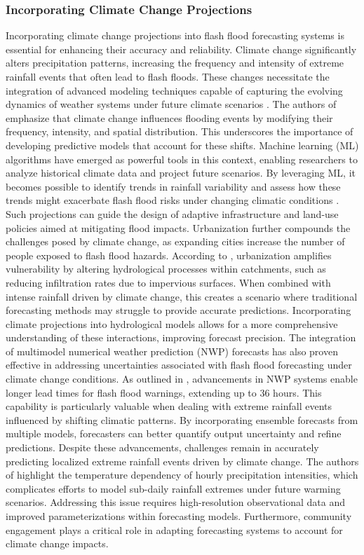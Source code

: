 \subsubsection{Incorporating Climate Change Projections}
Incorporating climate change projections into flash flood forecasting systems is essential for enhancing their accuracy and reliability. Climate change significantly alters precipitation patterns, increasing the frequency and intensity of extreme rainfall events that often lead to flash floods. These changes necessitate the integration of advanced modeling techniques capable of capturing the evolving dynamics of weather systems under future climate scenarios \citep{Msigwa2024}. The authors of emphasize that climate change influences flooding events by modifying their frequency, intensity, and spatial distribution. This underscores the importance of developing predictive models that account for these shifts. Machine learning (ML) algorithms have emerged as powerful tools in this context, enabling researchers to analyze historical climate data and project future scenarios. By leveraging ML, it becomes possible to identify trends in rainfall variability and assess how these trends might exacerbate flash flood risks under changing climatic conditions \citep{Abegaz2024}. Such projections can guide the design of adaptive infrastructure and land-use policies aimed at mitigating flood impacts. Urbanization further compounds the challenges posed by climate change, as expanding cities increase the number of people exposed to flash flood hazards. According to \citep{Msigwa2024}, urbanization amplifies vulnerability by altering hydrological processes within catchments, such as reducing infiltration rates due to impervious surfaces. When combined with intense rainfall driven by climate change, this creates a scenario where traditional forecasting methods may struggle to provide accurate predictions. Incorporating climate projections into hydrological models allows for a more comprehensive understanding of these interactions, improving forecast precision. The integration of multimodel numerical weather prediction (NWP) forecasts has also proven effective in addressing uncertainties associated with flash flood forecasting under climate change conditions. As outlined in \citep{Georgakakos2022}, advancements in NWP systems enable longer lead times for flash flood warnings, extending up to 36 hours. This capability is particularly valuable when dealing with extreme rainfall events influenced by shifting climatic patterns. By incorporating ensemble forecasts from multiple models, forecasters can better quantify output uncertainty and refine predictions. Despite these advancements, challenges remain in accurately predicting localized extreme rainfall events driven by climate change. The authors of \citep{Fowler2021} highlight the temperature dependency of hourly precipitation intensities, which complicates efforts to model sub-daily rainfall extremes under future warming scenarios. Addressing this issue requires high-resolution observational data and improved parameterizations within forecasting models. Furthermore, community engagement plays a critical role in adapting forecasting systems to account for climate change impacts. 